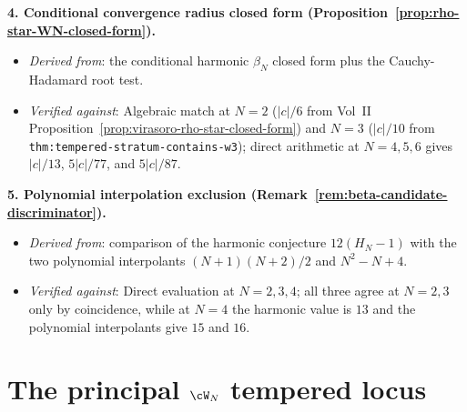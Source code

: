 \textbf{4. Conditional convergence radius closed form
(Proposition~\ref{prop:rho-star-WN-closed-form}).}
\begin{itemize}[nosep]
\item \emph{Derived from}: the conditional harmonic $\beta_N$ closed form plus
 the Cauchy-Hadamard root test.
\item \emph{Verified against}: Algebraic match at $N = 2$ ($|c|/6$
 from Vol~II Proposition~\ref{prop:virasoro-rho-star-closed-form}) and $N = 3$
 ($|c|/10$ from \texttt{thm:tempered-stratum-contains-w3}); direct
 arithmetic at $N = 4, 5, 6$ gives $|c|/13$, $5|c|/77$, and
 $5|c|/87$.
\end{itemize}

\textbf{5. Polynomial interpolation exclusion
(Remark~\ref{rem:beta-candidate-discriminator}).}
\begin{itemize}[nosep]
\item \emph{Derived from}: comparison of the harmonic conjecture
 $12(H_N-1)$ with the two polynomial interpolants $(N+1)(N+2)/2$ and
 $N^2 - N + 4$.
\item \emph{Verified against}: Direct evaluation at $N = 2, 3, 4$;
 all three agree at $N = 2, 3$ only by coincidence, while at $N = 4$
 the harmonic value is $13$ and the polynomial interpolants give
 $15$ and $16$.
\end{itemize}

\section{The principal \texorpdfstring{$\cW_N$}{W_N} tempered locus}
\label{sec:wn-tempered-closure-location}

